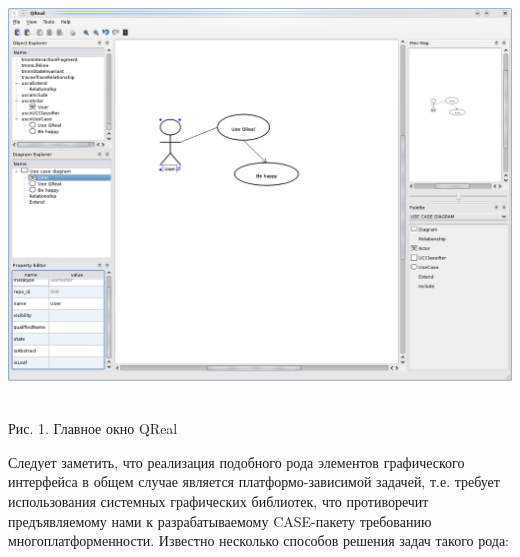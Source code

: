 \documentclass[a4paper]{article}
\begin{document}
{\centering 
\includegraphics[width=14.704cm,height=10.918cm]{draft04-img1.png}
\par}

{\centering{}
Рис. 1. Главное окно \foreignlanguage{english}{QReal}
\par}

{
Следует заметить, что реализация подобного рода элементов графического
интерфейса в общем случае является платформо-зависимой задачей, т.е.
требует использования системных графических библиотек, что противоречит
предъявляемому нами к разрабатываемому
\foreignlanguage{english}{CASE}{}-пакету требованию
многоплатформенности. Известно несколько способов решения задач такого
рода:}
\end{document}
